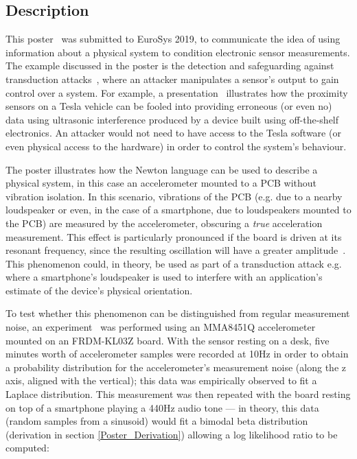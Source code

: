 \documentclass[12pt]{article}
\begin{document}
\begin{appendix}
    \subsection{Description}
      This poster~\cite{eurosys_poster} was submitted to EuroSys 2019, to communicate the idea of using information about a physical system to condition electronic sensor measurements. The example discussed in the poster is the detection and safeguarding against transduction attacks~\cite{Fu_2018}, where an attacker manipulates a sensor's output to gain control over a system. For example, a presentation~\cite{autonomous_vehicles} illustrates how the proximity sensors on a Tesla vehicle can be fooled into providing erroneous (or even no) data using ultrasonic interference produced by a device built using off-the-shelf electronics. An attacker would not need to have access to the Tesla software (or even physical access to the hardware) in order to control the system's behaviour.

      The poster illustrates how the Newton language can be used to describe a physical system, in this case an accelerometer mounted to a PCB without vibration isolation. In this scenario, vibrations of the PCB (e.g. due to a nearby loudspeaker or even, in the case of a smartphone, due to loudspeakers mounted to the PCB) are measured by the accelerometer, obscuring a \textit{true} acceleration measurement. This effect is particularly pronounced if the board is driven at its resonant frequency, since the resulting oscillation will have a greater amplitude~\cite{adi}. This phenomenon could, in theory, be used as part of a transduction attack e.g. where a smartphone's loudspeaker is used to interfere with an application's estimate of the device's physical orientation.

      To test whether this phenomenon can be distinguished from regular measurement noise, an experiment~\cite{poster_experiment} was performed using an MMA8451Q accelerometer mounted on an FRDM-KL03Z board. With the sensor resting on a desk, five minutes worth of accelerometer samples were recorded at 10Hz in order to obtain a probability distribution for the accelerometer's measurement noise (along the z axis, aligned with the vertical); this data was empirically observed to fit a Laplace distribution. This measurement was then repeated with the board resting on top of a smartphone playing a 440Hz audio tone --- in theory, this data (random samples from a sinusoid) would fit a bimodal beta distribution (derivation in section \ref{Poster_Derivation}) allowing a log likelihood ratio to be computed:


\end{appendix}
\end{document}
